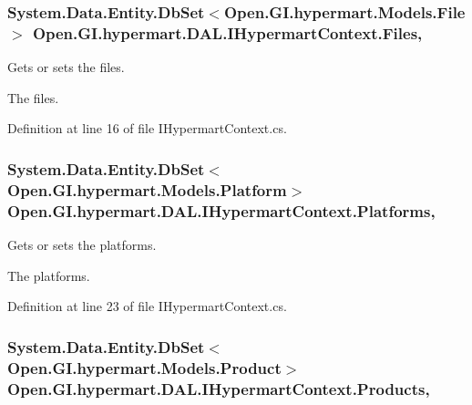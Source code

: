 \subsubsection[{Files}]{\setlength{\rightskip}{0pt plus 5cm}System.\+Data.\+Entity.\+Db\+Set$<${\bf Open.\+G\+I.\+hypermart.\+Models.\+File}$>$ Open.\+G\+I.\+hypermart.\+D\+A\+L.\+I\+Hypermart\+Context.\+Files\hspace{0.3cm}{\ttfamily [get]}, {\ttfamily [set]}}\label{interface_open_1_1_g_i_1_1hypermart_1_1_d_a_l_1_1_i_hypermart_context_ad55483dd70d49187d4ef3fc2f33eeed5}


Gets or sets the files. 

The files. 

Definition at line 16 of file I\+Hypermart\+Context.\+cs.

\hypertarget{interface_open_1_1_g_i_1_1hypermart_1_1_d_a_l_1_1_i_hypermart_context_a580b33089049ddd9288285d5b6207329}{}
\subsubsection[{Platforms}]{\setlength{\rightskip}{0pt plus 5cm}System.\+Data.\+Entity.\+Db\+Set$<${\bf Open.\+G\+I.\+hypermart.\+Models.\+Platform}$>$ Open.\+G\+I.\+hypermart.\+D\+A\+L.\+I\+Hypermart\+Context.\+Platforms\hspace{0.3cm}{\ttfamily [get]}, {\ttfamily [set]}}\label{interface_open_1_1_g_i_1_1hypermart_1_1_d_a_l_1_1_i_hypermart_context_a580b33089049ddd9288285d5b6207329}


Gets or sets the platforms. 

The platforms. 

Definition at line 23 of file I\+Hypermart\+Context.\+cs.

\hypertarget{interface_open_1_1_g_i_1_1hypermart_1_1_d_a_l_1_1_i_hypermart_context_a173fd0de652e5d4a60803383c0046956}{}
\subsubsection[{Products}]{\setlength{\rightskip}{0pt plus 5cm}System.\+Data.\+Entity.\+Db\+Set$<${\bf Open.\+G\+I.\+hypermart.\+Models.\+Product}$>$ Open.\+G\+I.\+hypermart.\+D\+A\+L.\+I\+Hypermart\+Context.\+Products\hspace{0.3cm}{\ttfamily [get]}, {\ttfamily [set]}}\label{interface_open_1_1_g_i_1_1hypermart_1_1_d_a_l_1_1_i_hypermart_context_a173fd0de652e5d4a60803383c0046956}



